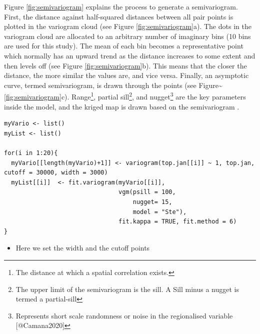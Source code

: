 Figure \ref{fig:semivariogram} explains the process to generate a
semivariogram. First, the distance against half-squared distances
between all pair points is plotted in the variogram cloud (see Figure
\ref{fig:semivariogram}a). The dots in the variogram cloud are allocated
to an arbitrary number of imaginary bins (10 bins are used for this
study). The mean of each bin becomes a representative point which
normally has an upward trend as the distance increases to some extent
and then levels off (see Figure \ref{fig:semivariogram}b). This means
that the closer the distance, the more similar the values are, and vice
versa. Finally, an asymptotic curve, termed semivariogram, is drawn
through the points (see
Figure\textasciitilde{}\ref{fig:semivariogram}c).
Range\footnote{The distance at which a spatial correlation exists.},
partial
sill\footnote{The upper limit of the semivariogram is the sill. A Sill minus a nugget is termed a partial-sill},
and
nugget\footnote{Represents short scale randomness or noise in the regionalised variable [@Camana2020]}
are the key parameters inside the model, and the kriged map is drawn
based on the semivariogram \citep{Law2019}.

\begin{verbatim}
myVario <- list()
myList <- list()

for(i in 1:20){
  myVario[[length(myVario)+1]] <- variogram(top.jan[[i]] ~ 1, top.jan, cutoff = 30000, width = 3000)
  myList[[i]]  <- fit.variogram(myVario[[i]], 
                                vgm(psill = 100,
                                    nugget= 15,
                                    model = "Ste"),
                                fit.kappa = TRUE, fit.method = 6)
}
\end{verbatim}

\begin{itemize}
\tightlist
\item
  Here we set the width and the cutoff points
\end{itemize}



\address{%
Hyesop Shin\\
MRC/CSO Social and Public Health Sciences Unit, University of Glasgow\\%
Berkeley Square, 99 Berkeley Street, Glasgow, G3 7HR\\
%
\url{https://www.gla.ac.uk/researchinstitutes/healthwellbeing/staff/hyesopshin/}\\%
%
\href{mailto:hyesop.shin@glasgow.ac.uk}{\nolinkurl{hyesop.shin@glasgow.ac.uk}}%
}
